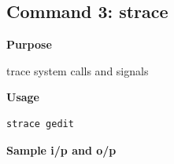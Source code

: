 \subsection{Command 3: strace} 
\textbf{Purpose}
\begin{flushleft}
trace system calls and signals
\end{flushleft}
\textbf{Usage}
\begin{verbatim}
strace gedit
\end{verbatim}
\textbf{Sample i/p and o/p}
\begin{figure}[H] 
\end{figure}
